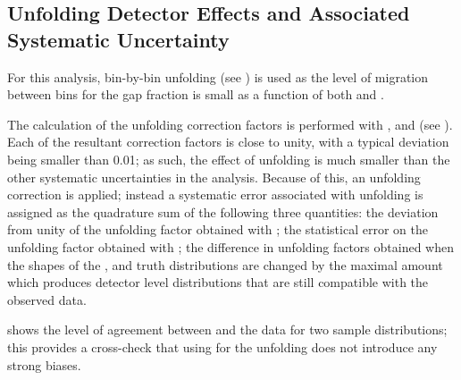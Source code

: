 \subsection{Unfolding Detector Effects and Associated Systematic Uncertainty}
\label{sec:gbj:unfolding}
For this analysis, bin-by-bin unfolding (see )
is used as the level of migration between bins for the gap fraction is small as
a function of both \pTbar and \DeltaY.

The calculation of the unfolding correction factors is performed with \Pythia,
\Herwigpp and \Alpgen (see ). Each of
the resultant correction factors is close to unity, with a typical deviation
being smaller than 0.01; as such, the effect of unfolding is much smaller than
the other systematic uncertainties in the analysis. Because of this, an
unfolding correction is applied; instead a systematic error associated with
unfolding is assigned as the quadrature sum of the following three quantities:
the deviation from unity of the unfolding factor obtained with \Pythia; the
statistical error on the unfolding factor obtained with \Pythia; the difference in unfolding
factors obtained when the shapes of the \pTbar, \DeltaY and \pTthree truth
distributions are changed by the maximal amount which produces detector level
distributions that are still compatible with the observed data.

 shows the level of agreement
between \Pythia and the data for two sample distributions; this provides a cross-check
that using \Pythia for the unfolding does not introduce any strong biases.


